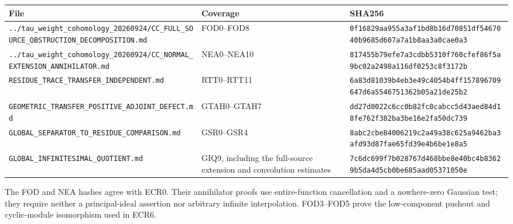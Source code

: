 {\def\LTcaptype{none} %
\begin{longtable}[]{@{}
  >{\raggedright\arraybackslash}p{}
  >{\raggedright\arraybackslash}p{}
  >{\raggedright\arraybackslash}p{}@{}}
\toprule\noalign{}
\begin{minipage}[b]{\linewidth}\raggedright
File
\end{minipage} & \begin{minipage}[b]{\linewidth}\raggedright
Coverage
\end{minipage} & \begin{minipage}[b]{\linewidth}\raggedright
SHA256
\end{minipage} \\
\midrule\noalign{}
\endhead
\bottomrule\noalign{}
\endlastfoot
\nolinkurl{../tau_weight_cohomology_20260924/CC_FULL_SOURCE_OBSTRUCTION_DECOMPOSITION.md}
& FOD0--FOD8 &
\nolinkurl{0f16829aa955a3af1bd8b16d70851df5467040b9685d607a7a1b8aa3a0cae0a3} \\
\nolinkurl{../tau_weight_cohomology_20260924/CC_NORMAL_EXTENSION_ANNIHILATOR.md}
& NEA0--NEA10 &
\nolinkurl{817455b79efe7a3cdbb5310f760cfef86f5a9bc02a2498a116df0253c8f3172b} \\
\nolinkurl{RESIDUE_TRACE_TRANSFER_INDEPENDENT.md} & RTT0--RTT11 &
\nolinkurl{6a83d81039b4eb3e49c4054b4ff157896709647d6a5546751362b05a21de25b2} \\
\nolinkurl{GEOMETRIC_TRANSFER_POSITIVE_ADJOINT_DEFECT.md} & GTAH0--GTAH7
&
\nolinkurl{dd27d0022c6cc0b82fc0cabcc5d43aed84d18fe762f382ba3be16e2fa50dc739} \\
\nolinkurl{GLOBAL_SEPARATOR_TO_RESIDUE_COMPARISON.md} & GSR0--GSR4 &
\nolinkurl{8abc2cbe84006219c2a49a38c625a9462ba3afd93d87fae65fd39e4b6be1e8a5} \\
\nolinkurl{GLOBAL_INFINITESIMAL_QUOTIENT.md} & GIQ9, including the
full-source extension and convolution estimates &
\nolinkurl{7c6dc699f7b028767d468bbe8e40bc4b83629b5da4d5cb0be685aad05371050e} \\
\end{longtable}
}

The FOD and NEA hashes agree with ECR0. Their annihilator proofs use
entire-function cancellation and a nowhere-zero Gaussian test; they
require neither a principal-ideal assertion nor arbitrary infinite
interpolation. FOD3--FOD5 prove the low-component pushout and
cyclic-module isomorphism used in ECR6.

